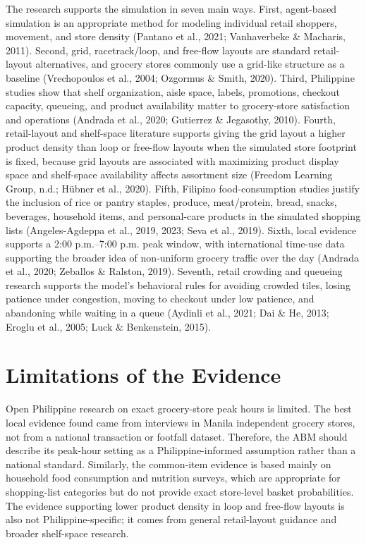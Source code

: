 \documentclass[12pt]{article}
\begin{document}
The research supports the simulation in seven main ways. First, agent-based simulation is an appropriate method for modeling individual retail shoppers, movement, and store density (Pantano et al., 2021; Vanhaverbeke \& Macharis, 2011). Second, grid, racetrack/loop, and free-flow layouts are standard retail-layout alternatives, and grocery stores commonly use a grid-like structure as a baseline (Vrechopoulos et al., 2004; Ozgormus \& Smith, 2020). Third, Philippine studies show that shelf organization, aisle space, labels, promotions, checkout capacity, queueing, and product availability matter to grocery-store satisfaction and operations (Andrada et al., 2020; Gutierrez \& Jegasothy, 2010). Fourth, retail-layout and shelf-space literature supports giving the grid layout a higher product density than loop or free-flow layouts when the simulated store footprint is fixed, because grid layouts are associated with maximizing product display space and shelf-space availability affects assortment size (Freedom Learning Group, n.d.; H\"ubner et al., 2020). Fifth, Filipino food-consumption studies justify the inclusion of rice or pantry staples, produce, meat/protein, bread, snacks, beverages, household items, and personal-care products in the simulated shopping lists (Angeles-Agdeppa et al., 2019, 2023; Seva et al., 2019). Sixth, local evidence supports a 2:00 p.m.--7:00 p.m. peak window, with international time-use data supporting the broader idea of non-uniform grocery traffic over the day (Andrada et al., 2020; Zeballos \& Ralston, 2019). Seventh, retail crowding and queueing research supports the model's behavioral rules for avoiding crowded tiles, losing patience under congestion, moving to checkout under low patience, and abandoning while waiting in a queue (Aydinli et al., 2021; Dai \& He, 2013; Eroglu et al., 2005; Luck \& Benkenstein, 2015).

\section{Limitations of the Evidence}

Open Philippine research on exact grocery-store peak hours is limited. The best local evidence found came from interviews in Manila independent grocery stores, not from a national transaction or footfall dataset. Therefore, the ABM should describe its peak-hour setting as a Philippine-informed assumption rather than a national standard. Similarly, the common-item evidence is based mainly on household food consumption and nutrition surveys, which are appropriate for shopping-list categories but do not provide exact store-level basket probabilities. The evidence supporting lower product density in loop and free-flow layouts is also not Philippine-specific; it comes from general retail-layout guidance and broader shelf-space research.
\end{document}
